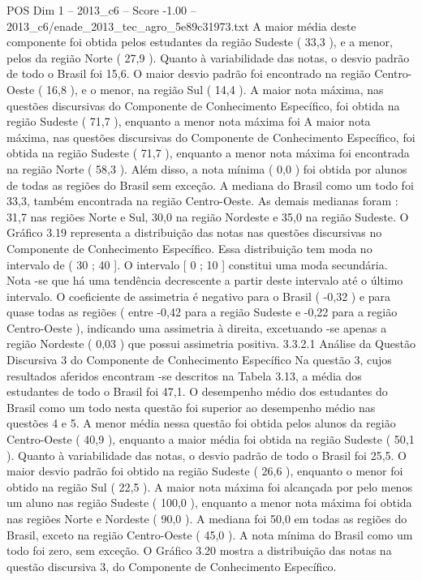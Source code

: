 \begin{textsample}{POS Dim 1 – 2013\_c6 – Score -1.00 – 2013\_c6/enade\_2013\_tec\_agro\_5e89c31973.txt}
A maior média deste componente foi obtida pelos estudantes da região Sudeste ( 33,3 ), e a menor, pelos da região Norte ( 27,9 ).
Quanto à variabilidade das notas, o desvio padrão de todo o Brasil foi 15,6.
O maior desvio padrão foi encontrado na região Centro-Oeste ( 16,8 ), e o menor, na região Sul ( 14,4 ).
A maior nota máxima, nas questões discursivas do Componente de Conhecimento Específico, foi obtida na região Sudeste ( 71,7 ), enquanto a menor nota máxima foi A maior nota máxima, nas questões discursivas do Componente de Conhecimento Específico, foi obtida na região Sudeste ( 71,7 ), enquanto a menor nota máxima foi encontrada na região Norte ( 58,3 ).
Além disso, a nota mínima ( 0,0 ) foi obtida por alunos de todas as regiões do Brasil sem exceção.
A mediana do Brasil como um todo foi 33,3, também encontrada na região Centro-Oeste.
As demais medianas foram : 31,7 nas regiões Norte e Sul, 30,0 na região Nordeste e 35,0 na região Sudeste.
O Gráfico 3.19 representa a distribuição das notas nas questões discursivas no Componente de Conhecimento Específico.
Essa distribuição tem moda no intervalo de ( 30 ; 40 ].
O intervalo [ 0 ; 10 ] constitui uma moda secundária.
Nota -se que há uma tendência decrescente a partir deste intervalo até o último intervalo.
O coeficiente de assimetria é negativo para o Brasil ( -0,32 ) e para quase todas as regiões ( entre -0,42 para a região Sudeste e -0,22 para a região Centro-Oeste ), indicando uma assimetria à direita, excetuando -se apenas a região Nordeste ( 0,03 ) que possui assimetria positiva. 3.3.2.1 Análise da Questão Discursiva 3 do Componente de Conhecimento Específico Na questão 3, cujos resultados aferidos encontram -se descritos na Tabela 3.13, a média dos estudantes de todo o Brasil foi 47,1.
O desempenho médio dos estudantes do Brasil como um todo nesta questão foi superior ao desempenho médio nas questões 4 e 5.
A menor média nessa questão foi obtida pelos alunos da região Centro-Oeste ( 40,9 ), enquanto a maior média foi obtida na região Sudeste ( 50,1 ).
Quanto à variabilidade das notas, o desvio padrão de todo o Brasil foi 25,5.
O maior desvio padrão foi obtido na região Sudeste ( 26,6 ), enquanto o menor foi obtido na região Sul ( 22,5 ).
A maior nota máxima foi alcançada por pelo menos um aluno nas região Sudeste ( 100,0 ), enquanto a menor nota máxima foi obtida nas regiões Norte e Nordeste ( 90,0 ).
A mediana foi 50,0 em todas as regiões do Brasil, exceto na região Centro-Oeste ( 45,0 ).
A nota mínima do Brasil como um todo foi zero, sem exceção.
O Gráfico 3.20 mostra a distribuição das notas na questão discursiva 3, do Componente de Conhecimento Específico.

\end{textsample}
